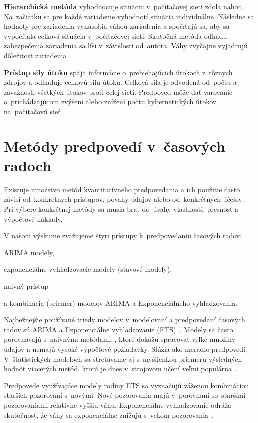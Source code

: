 \documentclass[thesismargins, thesislinespacing, openright, upjsfrontpage]{rnthesis}
\begin{document}
\textbf{Hierarchická metóda} vyhodnocuje situáciu v~počítačovej sieti zdola nahor. Na~začiatku sa pre každé zariadenie vyhodnotí situácia individuálne. Následne sa hodnoty pre  zariadenia vynásobia váhou zariadenia a spočítajú sa, aby sa vypočítala celková situácia v~počítačovej sieti. Skutočná metóda odhadu zabezpečenia zariadenia  sa líši v~závislosti od~autora. Váhy zvyčajne vyjadrujú dôležitosť zariadenia~\cite{Husak2018survey}.

\textbf{Prístup sily útoku} spája informácie o~prebiehajúcich útokoch z~rôznych zdrojov a odhaduje celkovú silu útoku. Celková sila je odvodená od~počtu a závažnosti všetkých útokov proti celej sieti. Predpoveď môže dať varovanie o~prichádzajúcom zvýšení alebo znížení počtu kybernetických útokov na~počítačovú sieť~\cite{Husak2018survey}.

\section{Metódy predpovedí v~časových radoch}

Existuje množstvo metód kvantitatívneho predpovedania a ich použitie často závisí od~konkrétnych prístupov, povahy údajov alebo od~konkrétnych účelov. Pri výbere konkrétnej metódy sa musia brať do~úvahy vlastnosti, presnosť a výpočtové náklady.

V našom výskume zvažujeme štyri prístupy k~predpovedaniu časových radov: 
\begin{compactenum}
    \item ARIMA modely,
    \item exponenciálne vyhladzovacie modely (stavové modely),
    \item naivný prístup 
    \item a kombinácia (priemer) modelov ARIMA a Exponenciálneho vyhladzovania.
\end{compactenum}

Najbežnejšie používané triedy modelov v~modelovaní a predpovedaní časových radov sú ARIMA a Exponenciálne vyhladzovanie (ETS)~\cite{hyndman2018forecasting}. Modely sa často porovnávajú s~naivnými metódami~\cite{brockwell2016introduction, box2015time}, ktoré dokážu spracovať veľké množiny údajov a nemajú vysoké výpočtové požiadavky. Slúžia ako meradlo predpovedí. V~štatistických modeloch sa stretávame aj s~myšlienkou priemeru výsledných hodnôt viacerých metód, ktorá je dnes v~strojovom učení veľmi populárna~\cite{Husak2018survey}. 

Predpovede využívajúce modely rodiny ETS sa vyznačujú váženou kombináciou starších pozorovaní s~novými. Nové pozorovania majú v~porovnaní so~staršími pozorovaniami relatívne vyššiu váhu. Exponenciálne vyhladzovanie odráža skutočnosť, že váhy sa exponenciálne znižujú s~vekom pozorovania~\cite{hyndman2018forecasting,brockwell2016introduction}.
\end{document}
